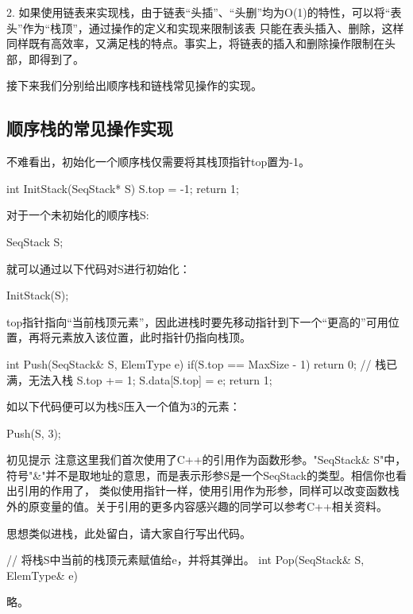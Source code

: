 2. 如果使用链表来实现栈，由于链表“头插”、“头删”均为O(1)的特性，可以将“表头”作为“栈顶”，通过操作的定义和实现来限制该表
只能在表头插入、删除，这样同样既有高效率，又满足栈的特点。事实上，将链表的插入和删除操作限制在头部，即得到了。

接下来我们分别给出顺序栈和链栈常见操作的实现。

\subsection{顺序栈的常见操作实现}
不难看出，初始化一个顺序栈仅需要将其栈顶指针top置为-1。
\begin{cppcode}
    int InitStack(SeqStack* S) {
        S.top = -1;
        return 1;
    }
\end{cppcode}
对于一个未初始化的顺序栈S:
\begin{cppcode}
    SeqStack S;
\end{cppcode}
就可以通过以下代码对S进行初始化：
\begin{cppcode}
    InitStack(S);
\end{cppcode}

top指针指向“当前栈顶元素”，因此进栈时要先移动指针到下一个“更高的”可用位置，再将元素放入该位置，此时指针仍指向栈顶。
\begin{cppcode}
    int Push(SeqStack& S, ElemType e) {    
        if(S.top == MaxSize - 1) {
            return 0;   // 栈已满，无法入栈
        }
        S.top += 1;
        S.data[S.top] = e;
        return 1;
    }
\end{cppcode}
如以下代码便可以为栈S压入一个值为3的元素：
\begin{cppcode}
    Push(S, 3);
\end{cppcode}

\begin{notebox}{初见提示}
    注意这里我们首次使用了C++的引用作为函数形参。"SeqStack\& S"中，符号"\&"并不是取地址的意思，而是表示形参S是一个SeqStack的类型。相信你也看出引用的作用了，
    类似使用指针一样，使用引用作为形参，同样可以改变函数栈外的原变量的值。关于引用的更多内容感兴趣的同学可以参考C++相关资料。
\end{notebox}

思想类似进栈，此处留白，请大家自行写出代码。
\begin{cppcode}
// 将栈S中当前的栈顶元素赋值给e，并将其弹出。
    int Pop(SeqStack& S, ElemType& e) {
        





    }
\end{cppcode}
略。

